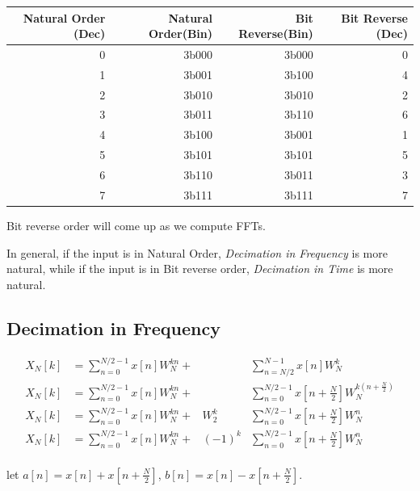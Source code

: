 \documentclass{article}
\begin{document}
\begin{tabular}{ | r | r | r | r | }
    \hline
    Natural Order (Dec) & Natural Order(Bin) & Bit Reverse(Bin) & Bit Reverse (Dec) \\
    \hline
    0 & 3b000 & 3b000 & 0 \\
    1 & 3b001 & 3b100 & 4 \\
    2 & 3b010 & 3b010 & 2 \\
    3 & 3b011 & 3b110 & 6 \\
    4 & 3b100 & 3b001 & 1 \\
    5 & 3b101 & 3b101 & 5 \\
    6 & 3b110 & 3b011 & 3 \\
    7 & 3b111 & 3b111 & 7 \\
    \hline
\end{tabular}

Bit reverse order will come up as we compute FFTs.

In general, if the input is in Natural Order, \emph{Decimation in Frequency} is more natural, while if the input is in
Bit reverse order, \emph{Decimation in Time} is more natural.

\pagebreak
\subsection{Decimation in Frequency}

\begin{align*}
    X_{N}\left[k\right] &= \sum_{n=0}^{N/2-1} x\left[n\right] W_{N}^{kn} + &                     & \sum_{n=N/2}^{N-1} x\left[n\right] W_{N}^{k} \\
    X_{N}\left[k\right] &= \sum_{n=0}^{N/2-1} x\left[n\right] W_{N}^{kn} + &                     & \sum_{n=0}^{N/2-1} x\left[n+\frac{N}{2}\right] W_{N}^{k\left(n + \frac{N}{2}\right)} \\
    X_{N}\left[k\right] &= \sum_{n=0}^{N/2-1} x\left[n\right] W_{N}^{kn} + & W_{2}^{k}           & \sum_{n=0}^{N/2-1} x\left[n+\frac{N}{2}\right] W_{N}^{n} \\
    X_{N}\left[k\right] &= \sum_{n=0}^{N/2-1} x\left[n\right] W_{N}^{kn} + & \left(-1\right)^{k} & \sum_{n=0}^{N/2-1} x\left[n+\frac{N}{2}\right] W_{N}^{n} \\
\end{align*}

let $a\left[n\right] = x\left[n\right] + x\left[n+\frac{N}{2}\right]$, $b\left[n\right] = x\left[n\right] - x\left[n+\frac{N}{2}\right]$.
\end{document}
